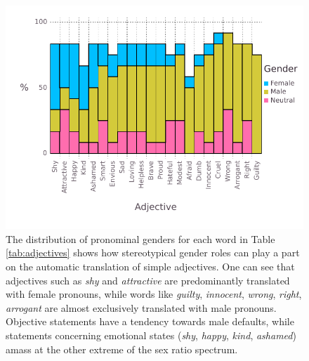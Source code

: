 \documentclass[jair,twoside,11pt,theapa]{article}
\begin{document}
\begin{figure}[H]
  \centering
  \includegraphics[width=\linewidth]{pictures/barplot-adjectives}
  \caption{The distribution of pronominal genders for each word in Table \ref{tab:adjectives} shows how stereotypical gender roles can play a part on the automatic translation of simple adjectives. One can see that adjectives such as \emph{shy} and \emph{attractive} are predominantly translated with female pronouns, while words like \emph{guilty}, \emph{innocent}, \emph{wrong}, \emph{right}, \emph{arrogant} are almost exclusively translated with male pronouns. Objective statements have a tendency towards male defaults, while statements concerning emotional states (\emph{shy}, \emph{happy}, \emph{kind}, \emph{ashamed}) amass at the other extreme of the sex ratio spectrum.}
  \label{fig:barplot-adjectives}
\end{figure}
\end{document}
